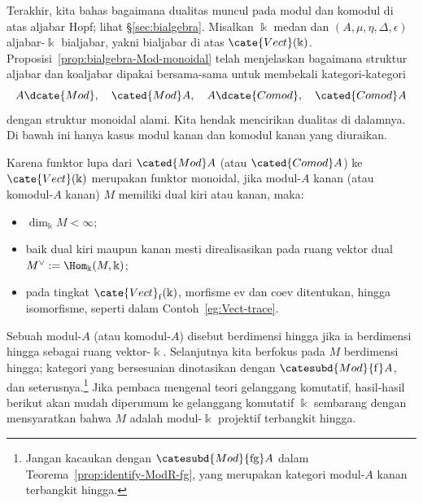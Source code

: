 
Terakhir, kita bahas bagaimana dualitas muncul pada modul dan komodul di
atas aljabar Hopf; lihat \S\ref{sec:bialgebra}. Misalkan $\Bbbk$ medan dan
$(A,\mu,\eta,\Delta,\epsilon)$ aljabar-$\Bbbk$ bialjabar, yakni bialjabar
di atas $\cate{Vect}(\Bbbk)$. Proposisi~\ref{prop:bialgebra-Mod-monoidal}
telah menjelaskan bagaimana struktur aljabar dan koaljabar dipakai
bersama-sama untuk membekali kategori-kategori
\[ A\dcate{Mod}, \quad \cated{Mod}A, \quad A\dcate{Comod}, \quad \cated{Comod}A \]
dengan struktur monoidal alami. Kita hendak mencirikan dualitas di
dalamnya. Di bawah ini hanya kasus modul kanan dan komodul kanan yang
diuraikan.

Karena funktor lupa dari $\cated{Mod}A$ (atau $\cated{Comod}A$) ke
$\cate{Vect}(\Bbbk)$ merupakan funktor monoidal, jika modul-$A$ kanan
(atau komodul-$A$ kanan) $M$ memiliki dual kiri atau kanan, maka:
\begin{itemize}
	\item $\dim_{\Bbbk}M<\infty$;
	\item baik dual kiri maupun kanan mesti direalisasikan pada ruang vektor
	dual $M^\vee:=\Hom_{\Bbbk}(M,\Bbbk)$;
	\item pada tingkat $\cate{Vect}_{\mathrm f}(\Bbbk)$, morfisme
	$\mathrm{ev}$ dan $\mathrm{coev}$ ditentukan, hingga isomorfisme,
	seperti dalam Contoh~\ref{eg:Vect-trace}.
\end{itemize}

Sebuah modul-$A$ (atau komodul-$A$) disebut berdimensi hingga jika ia
berdimensi hingga sebagai ruang vektor-$\Bbbk$. Selanjutnya kita berfokus
pada $M$ berdimensi hingga; kategori yang bersesuaian dinotasikan dengan
$\catesubd{Mod}{\mathrm f}A$, dan seterusnya.\footnote{Jangan kacaukan
dengan $\catesubd{Mod}{\mathrm{fg}}A$ dalam
Teorema~\ref{prop:identify-ModR-fg}, yang merupakan kategori modul-$A$
kanan terbangkit hingga.} Jika pembaca mengenal teori gelanggang
komutatif, hasil-hasil berikut akan mudah diperumum ke gelanggang komutatif
$\Bbbk$ sembarang dengan mensyaratkan bahwa $M$ adalah modul-$\Bbbk$
projektif terbangkit hingga.

